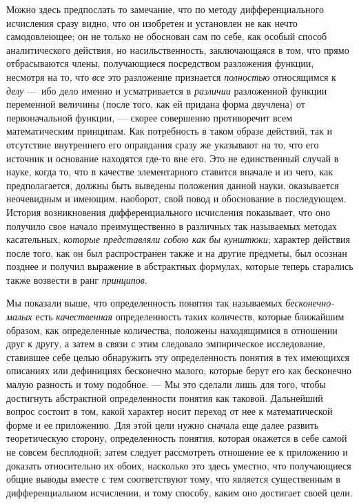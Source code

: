 Можно здесь предпослать то замечание, что по методу дифференциального
исчисления сразу видно, что он изобретен и установлен не как нечто
самодовлеющее; он не только не обоснован сам по себе, как особый способ
аналитического действия, но насильственность, заключающаяся в том, что
прямо отбрасываются члены, получающиеся посредством разложения функции,
несмотря на то, что {\em все} это разложение признается
{\em полностью} относящимся к
{\em делу} —~ибо дело именно и усматривается в
{\em различии} разложенной функции переменной величины
(после того, как ей придана форма двучлена) от первоначальной функции, —
скорее совершенно противоречит всем математическим принципам. Как
потребность в таком образе действий, так и отсутствие внутреннего его
оправдания сразу же указывают на то, что его источник и основание находятся
где-то вне его. Это не единственный случай в науке, когда то, что в
качестве элементарного ставится вначале и из чего, как предполагается,
должны быть выведены положения данной науки, оказывается неочевидным и
имеющим, наоборот, свой повод и обоснование в последующем. История
возникновения дифференциального исчисления показывает, что оно получило свое
начало преимущественно в различных так называемых методах касательных,
{\em которые представляли собою как бы кунштюки};
характер действия после того, как он был распространен также и на другие
предметы, был осознан позднее и получил выражение в абстрактных формулах,
которые теперь старались также возвести в ранг
{\em принципов}.

Мы показали выше, что определенность понятия так называемых
{\em бесконечно-малых} есть
{\em качественная} определенность таких количеств,
которые ближайшим образом, как определенные количества, положены
находящимися в отношении друг к другу, а затем в связи с этим следовало
эмпирическое исследование, ставившее себе целью обнаружить эту
определенность понятия в тех имеющихся описаниях или дефинициях бесконечно
малого, которые берут его как бесконечно малую разность и тому подобное. —
Мы это сделали лишь для того, чтобы достигнуть абстрактной определенности
понятия как таковой. Дальнейший вопрос состоит в том, какой характер носит
переход от нее к математической форме и ее приложению. Для этой цели нужно
сначала еще далее развить теоретическую сторону, определенность понятия,
которая окажется в себе самой не совсем бесплодной; затем следует
рассмотреть отношение ее к приложению и доказать относительно их обоих,
насколько это здесь уместно, что получающиеся общие выводы вместе с тем
соответствуют тому, что является существенным в дифференциальном исчислении,
и тому способу, каким оно достигает своей цели.

